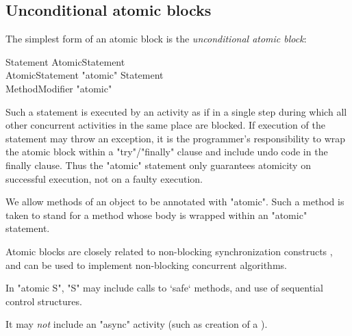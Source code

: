 \subsection{Unconditional atomic blocks}
The simplest form of an atomic block is the {\em unconditional
atomic block}:

\begin{grammar}
Statement \: AtomicStatement \\
AtomicStatement \: \xcd"atomic"  Statement \\
MethodModifier \: \xcd"atomic" \\
\end{grammar}


Such a statement is executed by an activity as if in a single step
during which all other concurrent activities in the same place are
blocked. If execution of the statement may throw an exception, it is
the programmer's responsibility to wrap the atomic block within a
\xcd"try"/\xcd"finally" clause and include undo code in the finally
clause. Thus the \xcd"atomic" statement only guarantees atomicity on
successful execution, not on a faulty execution.


We allow methods of an object to be annotated with \xcd"atomic". Such
a method is taken to stand for a method whose body is wrapped within an
\xcd"atomic" statement.


Atomic blocks are closely related to non-blocking synchronization
constructs \cite{herlihy91waitfree}, and can be used to implement 
non-blocking concurrent algorithms.


In \xcd"atomic S", \xcd"S" may include calls to \xcd`safe` methods, and use of
sequential control structures.

It may {\em not} include an \xcd"async" activity (such as creation
of a ).

